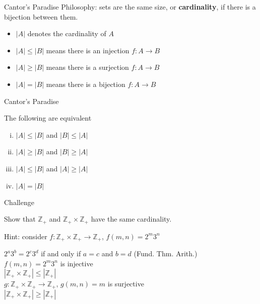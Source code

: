 \documentclass{beamer}
\begin{document}
\begin{frame}{Cantor's Paradise}
Philosophy: sets are the same size, or \textbf{cardinality}, if there is a bijection between them.
\begin{itemize}
\pause 
\item $|A|$ denotes the cardinality of $A$
\pause 
\item $|A| \leq |B|$ means there is an injection $f: A\rightarrow B$
\pause 
\item $|A| \geq |B|$ means there is a surjection $f: A\rightarrow B$
\pause 
\item $|A| = |B|$ means there is a bijection $f: A\rightarrow B$
\end{itemize}
\pause
\end{frame}

\begin{frame}{Cantor's Paradise}
\begin{thm}
The following are equivalent
\begin{enumerate}[(i)]
\item $|A|\leq |B|$  and $|B|\leq |A|$
\item $|A|\geq |B|$  and $|B|\geq |A|$
\item $|A|\leq |B|$  and $|A|\geq |A|$
\item $|A|= |B|$
\end{enumerate}
\end{thm}
\end{frame}

\begin{frame}{Challenge}
\begin{prob}
Show that $\mathbb{Z}_+$ and $\mathbb{Z}_+\times\mathbb{Z}_+$ have the same cardinality.
\end{prob}
\pause
Hint: consider $f: \mathbb{Z}_+\times\mathbb{Z}_+\rightarrow\mathbb{Z}_+$, $f(m,n) = 2^m3^n$
\begin{soln}
\pause
$2^a3^b = 2^c3^d$ if and only if $a=c$ and $b=d$ (Fund. Thm. Arith.)\\
\pause
$f(m,n) = 2^m3^n$ is injective\\
\pause
$|\mathbb{Z}_+\times\mathbb{Z}_+|\leq |\mathbb{Z}_+|$\\
\pause
$g: \mathbb{Z}_+\times\mathbb{Z}_+\rightarrow\mathbb{Z}_+$, $g(m,n) = m$ is surjective\\
\pause
$|\mathbb{Z}_+\times\mathbb{Z}_+|\geq |\mathbb{Z}_+|$
\end{soln}
\end{frame}
\end{document}

